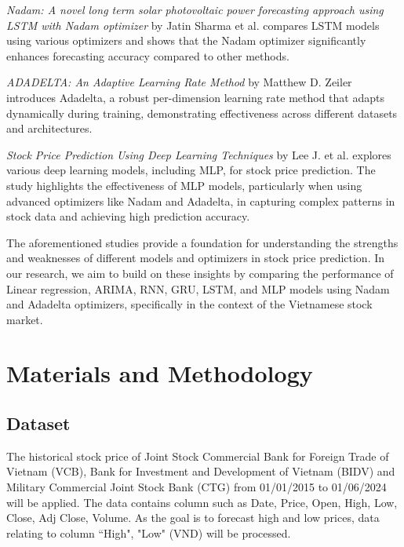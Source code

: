 \documentclass{ieeeojies}
\begin{document}
\textit{Nadam: A novel long term solar photovoltaic power forecasting approach using LSTM with Nadam optimizer} by Jatin Sharma et al. compares LSTM models using various optimizers and shows that the Nadam optimizer significantly enhances forecasting accuracy compared to other methods. \cite{b4}

\textit{ADADELTA: An Adaptive Learning Rate Method} by Matthew D. Zeiler introduces Adadelta, a robust per-dimension learning rate method that adapts dynamically during training, demonstrating effectiveness across different datasets and architectures. \cite{b5}

\textit{Stock Price Prediction Using Deep Learning Techniques} by Lee J. et al. explores various deep learning models, including MLP, for stock price prediction. The study highlights the effectiveness of MLP models, particularly when using advanced optimizers like Nadam and Adadelta, in capturing complex patterns in stock data and achieving high prediction accuracy. \cite{b6}

The aforementioned studies provide a foundation for understanding the strengths and weaknesses of different models and optimizers in stock price prediction. In our research, we aim to build on these insights by comparing the performance of Linear regression, ARIMA, RNN, GRU, LSTM, and MLP models using Nadam and Adadelta optimizers, specifically in the context of the Vietnamese stock market.

\section{Materials and Methodology}
\subsection{Dataset}
The historical stock price of Joint Stock Commercial Bank for Foreign Trade of Vietnam (VCB), Bank for Investment and Development of Vietnam (BIDV) and Military Commercial Joint Stock Bank (CTG) from 01/01/2015 to 01/06/2024 will be applied. The data contains column such as Date, Price, Open, High, Low, Close, Adj Close, Volume. As the goal is to forecast high and low prices, data relating to column “High", "Low" (VND) will be processed.
\end{document}
